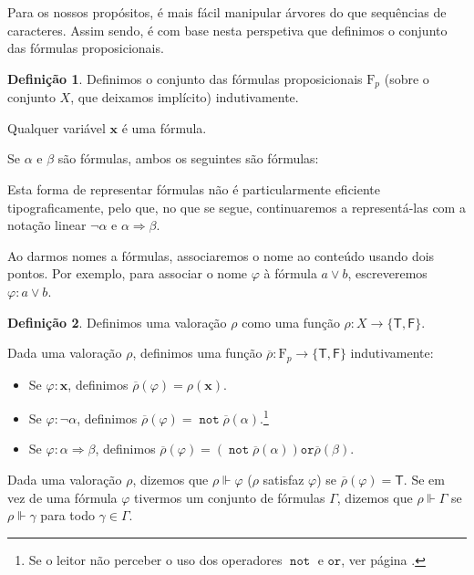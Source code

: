 \documentclass{report}
\theoremstyle{definition}
\newtheorem{definicao}{Definição}
\theoremstyle{remark}
\renewcommand{\bf}[1]{\mathbf{#1}}
\newcommand{\F}{\mathrm{F}}
\newcommand{\lt}{\mathsf{T}}
\newcommand{\lf}{\mathsf{F}}
\DeclareMathOperator{\pnot}{\texttt{not}}
\newcommand{\por}{\mathbin{\texttt{or}}}
\newcommand{\imply}{\mathbin{\Rightarrow}}
\begin{document}
	Para os nossos propósitos, é mais fácil manipular árvores do que sequências de caracteres. Assim sendo, é com base nesta perspetiva que definimos o conjunto das fórmulas proposicionais.
	
	\begin{definicao}
	Definimos o conjunto das fórmulas proposicionais $\F_p$ (sobre o conjunto $X$, que deixamos implícito) indutivamente.
	
	Qualquer variável $\bf x$ é uma fórmula.
	
	Se $\alpha$ e $\beta$ são fórmulas, ambos os seguintes são fórmulas:
	
	\begin{center}
	\hspace{3em}
	\end{center}
	
	Esta forma de representar fórmulas não é particularmente eficiente tipograficamente, pelo que, no que se segue, continuaremos a representá-las com a notação linear $\neg \alpha$ e $\alpha \imply \beta$.
	
	Ao darmos nomes a fórmulas, associaremos o nome ao conteúdo usando dois pontos. Por exemplo, para associar o nome $\varphi$ à fórmula $a \lor b$, escreveremos $\varphi : a \lor b$.
	\end{definicao}
	
	\begin{definicao}
	Definimos uma valoração $\rho$ como uma função $\rho : X \to \{\lt,\lf\}$.
	
	Dada uma valoração $\rho$, definimos uma função $\overline\rho : \F_p \to \{\lt, \lf\}$ indutivamente:
	
	\begin{itemize}
	\item Se $\varphi : \bf x$, definimos $\overline\rho(\varphi) = \rho(\bf x)$.
	
	\item Se $\varphi : \neg \alpha$, definimos $\overline\rho(\varphi) = \pnot \overline\rho(\alpha)$.\footnote{Se o leitor não perceber o uso dos operadores $\pnot$ e $\por$, ver página \pageref{tabela:operadores}.}
	
	\item Se $\varphi : \alpha \imply \beta$, definimos $\overline\rho(\varphi) = (\pnot \overline\rho(\alpha)) \por \overline\rho(\beta)$.
	\end{itemize}
	
	Dada uma valoração $\rho$, dizemos que $\rho \Vdash \varphi$ ($\rho$ satisfaz $\varphi$) se $\overline\rho(\varphi) = \lt$. Se em vez de uma fórmula $\varphi$ tivermos um conjunto de fórmulas $\Gamma$, dizemos que $\rho \Vdash \Gamma$ se $\rho \Vdash \gamma$ para todo $\gamma \in \Gamma$.
	\end{definicao}
	
\end{document}
